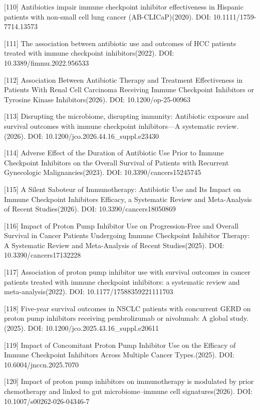\documentclass[11pt]{article}
\begin{document}
{[}110{]} Antibiotics impair immune checkpoint inhibitor effectiveness in Hispanic patients with non-small cell lung cancer (AB-CLICaP)(2020). DOI: 10.1111/1759-7714.13573

{[}111{]} The association between antibiotic use and outcomes of HCC patients treated with immune checkpoint inhibitors(2022). DOI: 10.3389/fimmu.2022.956533

{[}112{]} Association Between Antibiotic Therapy and Treatment Effectiveness in Patients With Renal Cell Carcinoma Receiving Immune Checkpoint Inhibitors or Tyrosine Kinase Inhibitors(2026). DOI: 10.1200/op-25-00963

{[}113{]} Disrupting the microbiome, disrupting immunity: Antibiotic exposure and survival outcomes with immune checkpoint inhibitors---A systematic review.(2026). DOI: 10.1200/jco.2026.44.16\_suppl.e23430

{[}114{]} Adverse Effect of the Duration of Antibiotic Use Prior to Immune Checkpoint Inhibitors on the Overall Survival of Patients with Recurrent Gynecologic Malignancies(2023). DOI: 10.3390/cancers15245745

{[}115{]} A Silent Saboteur of Immunotherapy: Antibiotic Use and Its Impact on Immune Checkpoint Inhibitors Efficacy, a Systematic Review and Meta-Analysis of Recent Studies(2026). DOI: 10.3390/cancers18050869

{[}116{]} Impact of Proton Pump Inhibitor Use on Progression-Free and Overall Survival in Cancer Patients Undergoing Immune Checkpoint Inhibitor Therapy: A Systematic Review and Meta-Analysis of Recent Studies(2025). DOI: 10.3390/cancers17132228

{[}117{]} Association of proton pump inhibitor use with survival outcomes in cancer patients treated with immune checkpoint inhibitors: a systematic review and meta-analysis(2022). DOI: 10.1177/17588359221111703

{[}118{]} Five-year survival outcomes in NSCLC patients with concurrent GERD on proton pump inhibitors receiving pembrolizumab or nivolumab: A global study.(2025). DOI: 10.1200/jco.2025.43.16\_suppl.e20611

{[}119{]} Impact of Concomitant Proton Pump Inhibitor Use on the Efficacy of Immune Checkpoint Inhibitors Across Multiple Cancer Types.(2025). DOI: 10.6004/jnccn.2025.7070

{[}120{]} Impact of proton pump inhibitors on immunotherapy is modulated by prior chemotherapy and linked to gut microbiome--immune cell signatures(2026). DOI: 10.1007/s00262-026-04346-7
\end{document}
